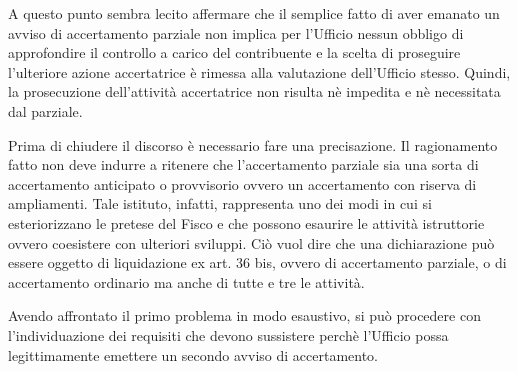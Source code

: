 A questo punto sembra lecito affermare che il semplice fatto di aver emanato un avviso di accertamento parziale non implica per l'Ufficio nessun obbligo di approfondire il controllo a carico del contribuente e la scelta di proseguire l'ulteriore azione accertatrice è rimessa alla valutazione dell'Ufficio stesso. Quindi, la prosecuzione dell'attività accertatrice non risulta nè impedita e nè necessitata dal parziale.

Prima di chiudere il discorso è necessario fare una precisazione. Il ragionamento fatto non deve indurre a ritenere che l'accertamento parziale sia una sorta di accertamento anticipato o provvisorio ovvero un accertamento con riserva di ampliamenti. Tale istituto, infatti, rappresenta uno dei modi in cui si esteriorizzano le pretese del Fisco e che possono esaurire le attività istruttorie ovvero coesistere con ulteriori sviluppi. Ciò vuol dire che una dichiarazione può essere oggetto di liquidazione ex art. 36 bis, ovvero di accertamento parziale, o di accertamento ordinario ma anche di tutte e tre le attività.

Avendo affrontato il primo problema in modo esaustivo, si può procedere con l'individuazione dei requisiti che devono sussistere perchè l'Ufficio possa legittimamente emettere un secondo avviso di accertamento.